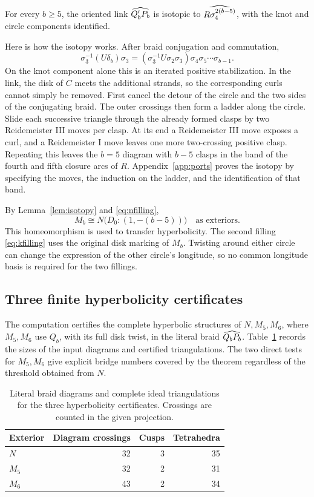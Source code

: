 \begin{lemma}\label{lem:isotopy}
For every \(b\ge5\), the oriented link \(\widehat{Q'_bP_b}\) is isotopic to
\(\widehat{R\sigma_4^{2(b-5)}}\), with the knot and circle components
identified.
\end{lemma}

Here is how the isotopy works. After braid conjugation and
commutation,
\[
  \sigma_3^{-1}(U\delta_b)\sigma_3
    =(\sigma_3^{-1}U\sigma_2\sigma_3)\sigma_4\sigma_5\cdots\sigma_{b-1}.
\]
On the knot component alone this is an iterated positive
stabilization. In the link, the disk of \(C\) meets the additional
strands, so the corresponding curls cannot simply be removed.
First cancel the detour of the circle and the two sides of the
conjugating braid. The outer crossings then form a ladder along the
circle. Slide each successive triangle through the already formed
clasps by two Reidemeister III moves per clasp. At its end a
Reidemeister III move exposes a curl, and a Reidemeister I move
leaves one more two-crossing positive clasp. Repeating this leaves
the \(b=5\) diagram with \(b-5\) clasps in the band of the fourth and
fifth closure arcs of \(R\). Appendix~\ref{app:ports} proves the
isotopy by specifying the moves, the induction on the ladder,
and the identification of that band.

By Lemma~\ref{lem:isotopy} and \eqref{eq:nfilling},
\[
       M_b\cong N\bigl(D_0:(1,-(b-5))\bigr)
                    \quad\text{as exteriors}.
\]
This homeomorphism is used to transfer hyperbolicity. The second
filling \eqref{eq:kfilling} uses the original disk marking of
\(M_b\). Twisting around either circle can change the expression
of the other circle's longitude, so no common longitude basis is
required for the two fillings.

\subsection{Three finite hyperbolicity certificates}\label{sec:certificates}

The computation certifies the complete hyperbolic structures of
\(N,M_5,M_6\), where \(M_5,M_6\) use \(Q_b\), with its full disk
twist, in the literal braid \(\widehat{Q_bP_b}\). Table~\ref{tab:cert}
records the sizes of the input diagrams and certified triangulations.
The two direct tests for \(M_5,M_6\) give explicit bridge numbers
covered by the theorem regardless of the threshold obtained from \(N\).

\begin{table}[htbp]
\centering
\begin{tabular}{lrrr}
\toprule
Exterior & Diagram crossings & Cusps & Tetrahedra\\
\midrule
\(N\)   & 32 & 3 & 35\\
\(M_5\) & 32 & 2 & 31\\
\(M_6\) & 43 & 2 & 34\\
\bottomrule
\end{tabular}
\caption{Literal braid diagrams and complete ideal triangulations
for the three hyperbolicity certificates. Crossings are counted
in the given projection.}
\label{tab:cert}
\end{table}


